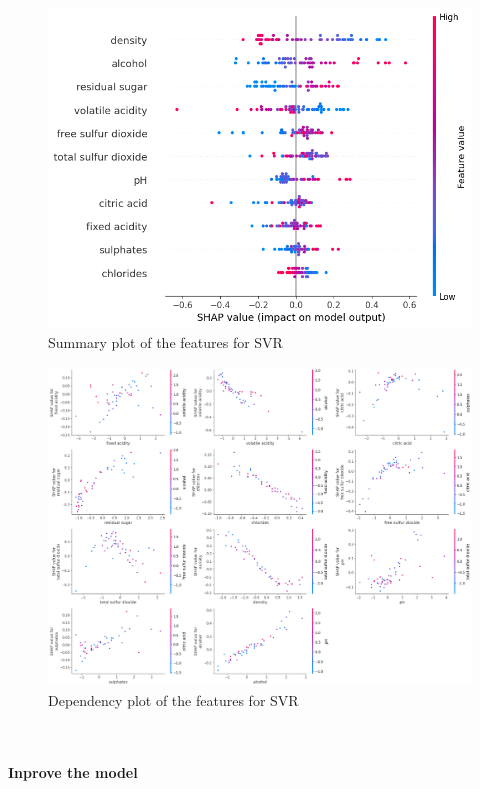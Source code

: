 \documentclass{article}
\newcommand{\subsubsubsection}[1]{%
  \paragraph{#1}\mbox{}\\}
\begin{document}
\begin{figure}
	\centering
	\includegraphics[width=\linewidth]{figures/shap-summary-svr.png}
	\caption{Summary plot of the features for SVR}
	\label{fig:summary-plot-svr}
\end{figure}

\begin{figure}
    \centering
    \includegraphics[width=\linewidth]{figures/shap-dependency-svr.png}
    \caption{Dependency plot of the features for SVR}
    \label{fig:dependency-plot-svr}
\end{figure}

\subsubsubsection{Inprove the model}
\end{document}
